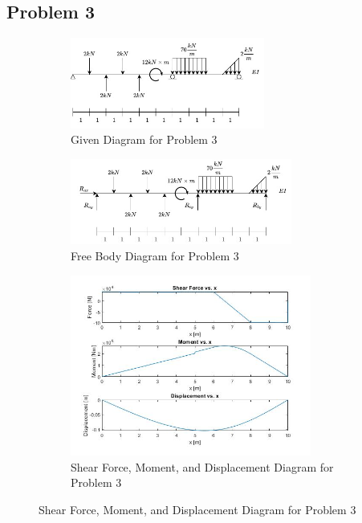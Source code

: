 \documentclass[a4paper]{article}
\begin{document}
\subsection{Problem 3}
\begin{figure}[H]
\centering
   \begin{subfigure}[b]{\textwidth}
   \centering
   \includegraphics[width=0.7\textwidth]{problems/prob_3.jpg}
   \caption{Given Diagram for Problem 3}
   \label{prob3:prob} 
\end{subfigure}
\begin{subfigure}[b]{\textwidth}
   \centering   
   \includegraphics[width=0.8\textwidth]{FBD/FBD_3.jpg}
   \caption{Free Body Diagram for Problem 3}
   \label{prob3:FBD}
\end{subfigure}
\begin{subfigure}[b]{\textwidth}
   \centering   
   \includegraphics[width=0.87\textwidth]{results/solution_3.jpg}
   \caption{Shear Force, Moment, and Displacement Diagram for Problem 3}
   \label{prob3:results}
\end{subfigure}
\label{prob3}
\end{figure}
\end{document}
